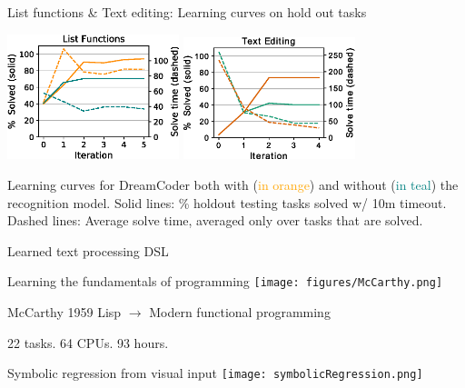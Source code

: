 \documentclass{beamer}
\newcommand{\orange}[1]{\textcolor{orange}{#1}}
\newcommand{\teal}[1]{\textcolor{teal}{#1}}
\begin{document}
\begin{frame}{List functions \& Text editing: Learning curves on hold out tasks}

  \begin{center}
    \includegraphics[width = 5cm]{figures/listLearningCurve.eps}
\hfill    \includegraphics[width = 5cm]{figures/textLearningCurve.eps} 
    \end{center}

Learning curves for DreamCoder both with (\orange{in orange}) and without
    (\teal{in teal}) the recognition model. Solid lines: \% holdout testing tasks solved w/ 10m timeout. Dashed lines: Average solve time, averaged only over tasks that are solved.


\end{frame}


\begin{frame}{Learned text processing DSL}

\end{frame}

\begin{frame}{Learning the fundamentals of programming}
  \texttt{[image: figures/McCarthy.png]}

\centering  McCarthy 1959 Lisp  $\longrightarrow$ Modern functional programming
  
  22 tasks. 64 CPUs. 93 hours.

  \end{frame}

\begin{frame}{Symbolic regression from visual input}
\centering\texttt{[image: symbolicRegression.png]}
\end{frame}
\end{document}
